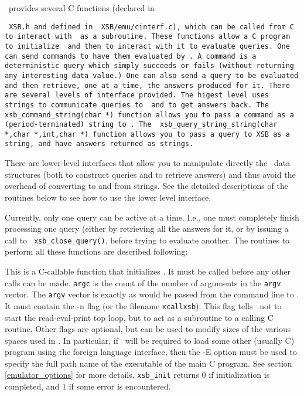 \ourprolog\ provides several C functions (declared in {\tt
XSB\emu\cinterf.h and defined in {\tt
XSB/emu/cinterf.c}), which can be called from C to interact with
\ourprolog\ as a subroutine. These functions allow a C program to
initialize \ourprolog\ and then to interact with it to evaluate queries.
One can send commands to have them evaluated by \ourprolog .  A command
is a deterministic query which simply succeeds or fails (without
returning any interesting data value.)  One can also send a query to be
evaluated and then retrieve, one at a time, the answers produced for it.
There are several levels of interface provided.  The higest level uses
strings to communicate queries to \ourprolog\ and to get answers back.
The {\tt xsb\_command\_string(char *)} function allows you to pass a
command as a (period-terminated) string to \ourprolog .  The {\tt
xsb\_query\_string\_string(char *,char *,int,char *)} function allows
you to pass a query to XSB as a string, and have answers returned as
strings.  

There are lower-level interfaces that allow you to manipulate directly
the \ourprolog\ data structures (both to construct queries and to
retrieve answers) and thus avoid the overhead of converting to and from
strings.  See the detailed descriptions of the routines below to see how
to use the lower level interface.

Currently, only one query can be active at a time.
I.e., one must completely finish processing one query (either by
retrieving all the answers for it, or by issuing a call to {\tt
xsb\_close\_query()}, before trying to evaluate another.  The
routines to perform all these functions are described following:

\begin{description}
 
This is a C-callable function that initializes \ourprolog . It must be
called before any other calls can be made.  {\tt argc} is the count of
the number of arguments in the {\tt argv} vector.  The {\tt argv}
vector is exactly as would be passed from the command line to
\ourprolog .  It must contain the -n flag (or the filename 
{\tt xcallxsb}).  This
flag tells \ourprolog\ not to start the read-eval-print top loop, but
to act as a subroutine to a calling C routine.  Other flags are
optional, but can be used to modify sizes of the various spaces used
in \ourprolog .  In particular, if \ourprolog\ will be required to
load some other (usually C) program using the foreign language
interface, then the -E option must be used to specify the full path
name of the executable of the main C program.  See section
\ref{emulator_options} for more details.  {\tt xsb\_init} returns 0 if
initialization is completed, and 1 if some error is encountered.


\end{description}}
